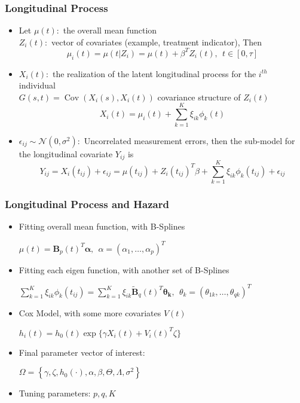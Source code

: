 \documentclass[10pt,dvipsnames,table, handout]{beamer} %
\newcommand{\Cov}[2]{\operatorname{Cov}\left( #1,#2 \right)}
\begin{document}
\begin{frame}
\frametitle{Longitudinal Process}
\begin{itemize}
\pause \item Let $\mu(t):$ the overall mean function \\
$Z_i(t):$ vector of covariates (example, treatment indicator), Then
\[ \mu_i(t) = \mu(t|Z_i) = \mu(t) + \beta^T Z_i(t), \ \ t \in [0, \tau] \]
\pause \item $X_i(t):$ the realization of the latent longitudinal process for the $i^{th}$ individual \\
$G(s, t) = \Cov{X_i(s)}{X_i(t)}$ covariance structure of $Z_i (t)$
\[ X_i (t) = \mu_i (t) + \sum_{k=1}^{K} \xi_{ik} \phi_k (t) \]
\pause \item $\epsilon _{ij} \sim  \mathcal{N}(0, \sigma^2): $ Uncorrelated measurement errors, then the sub-model for the longitudinal covariate $Y_{ij}$ is 
\[ Y_{ij} =  X_i(t_{ij}) + \epsilon _{ij} = \mu(t_{ij}) + Z_i(t_{ij})^T\beta + \sum_{k=1}^{K} \xi_{ik} \phi_k (t_{ij})+ \epsilon_{ij}\]
\end{itemize}

\end{frame}

\begin{frame}
\frametitle{Longitudinal Process and Hazard}
\begin{itemize}
\pause \item Fitting overall mean function, with B-Splines \\
\begin{center}
$ \mu(t) =  \mathbf{B}_p(t)^T \mathbf{\alpha},\ \ \alpha = (\alpha_1, \dots, \alpha_p)^T $
\end{center}
\pause \item Fitting each eigen function, with another set of B-Splines \\
\begin{center}
$ \sum_{k=1}^{K} \xi_{ik} \phi_k (t_{ij}) =  \sum_{k=1}^{K} \xi_{ik} \widetilde{\mathbf{B}}_q(t)^T \mathbf{\theta _k},\ \ \theta_{k} = (\theta_{1k}, \dots, \theta_{qk})^T $
\end{center}
\pause \item Cox Model, with some more covariates $V(t)$
\begin{center}
$ h_i(t) = h_0(t)\exp\{\gamma X_i(t) + V_i(t)^T \zeta \}$
\end{center}
\pause \item Final parameter vector of interest:
\begin{center}
$ \Omega = \left\{ \gamma, \zeta, h_0(\cdot), \alpha, \beta, \Theta, \Lambda, \sigma^2 \right\} $
\end{center}
\item Tuning parameters: $p, q, K$
\end{itemize}
\end{frame}
\end{document}
